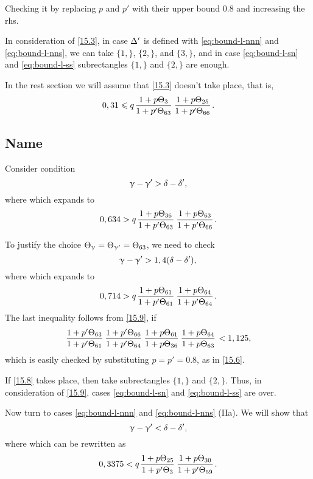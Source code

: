 Checking it by replacing $p$ and $p'$ with their upper bound 0.8 and increasing the rhs.

In consideration of \ref{15.3},
in case $\Delta'$ is defined with \ref{eq:bound-l-nnn} and \ref{eq:bound-l-nns},
we can take $\{1,\}$, $\{2,\}$, and $\{3,\}$,
and in case \ref{eq:bound-l-sn} and \ref{eq:bound-l-ss}
subrectangles $\{1,\}$ and $\{2,\}$ are enough.

In the rest section we will assume that \ref{15.3} doesn't take place, that is,
\begin{equation}\label{15.7}
	0,31 \leqslant q \up{3}{63} \up{25}{66}.
\end{equation}

\subsection{Name}

Consider condition
\begin{equation}\label{15.8}
	\upgamma - \upgamma' > \delta - \delta',
\end{equation}
where
which expands to
\begin{equation}\label{15.9}
	0,634 > q \up{36}{63} \up{63}{66}.
\end{equation}

To justify the choice $\Theta_{\upgamma} = \Theta_{\upgamma'} = \Theta_{63}$, we need to check
\begin{equation}\label{15.10}
	\upgamma - \upgamma' > 1,4 (\delta - \delta'),
\end{equation}
where
which expands to
\begin{equation}\label{15.11}
	0,714 > q\up{61}{61}\up{64}{64}.
\end{equation}
The last inequality follows from \ref{15.9}, if
\begin{equation}
	\pp{63}{61} \pp{66}{64} \uu{61}{36} \uu{64}{63} < 1,125,
\end{equation}
which is easily checked by substituting $p = p' = 0.8$, as in \ref{15.6}.

If \ref{15.8} takes place, then take subrectangles $\{1,\}$ and $\{2,\}$.
Thus, in consideration of \ref{15.9}, cases \ref{eq:bound-l-sn} and \ref{eq:bound-l-ss} are over.

Now turn to cases \ref{eq:bound-l-nnn} and \ref{eq:bound-l-nns} (IIa).
We will show that
\begin{equation}\label{15.12}
	\upgamma - \upgamma' < \delta - \delta',
\end{equation}
where
which can be rewritten as
\begin{equation}\label{15.13}
	0,3375 < q \up{25}{3} \up{30}{59}.
\end{equation}

